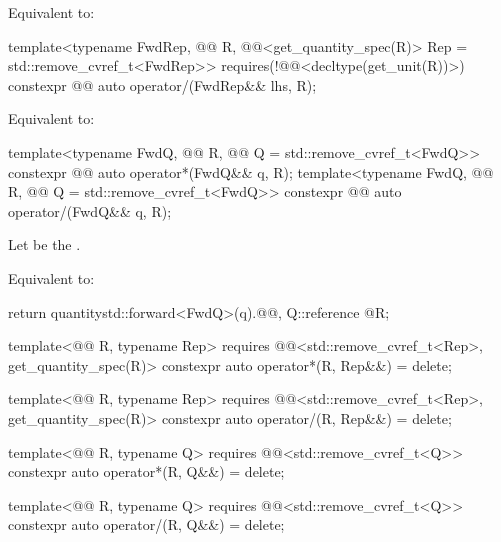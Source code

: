 \begin{itemdescr}
\pnum
\effects
Equivalent to:
\end{itemdescr}

\begin{itemdecl}
template<typename FwdRep, @@ R,
         @@<get_quantity_spec(R{})> Rep = std::remove_cvref_t<FwdRep>>
  requires(!@@<decltype(get_unit(R{}))>)
constexpr @@ auto operator/(FwdRep&& lhs, R);
\end{itemdecl}

\begin{itemdescr}
\pnum
\effects
Equivalent to:
\end{itemdescr}

\begin{itemdecl}
template<typename FwdQ, @@ R, @@ Q = std::remove_cvref_t<FwdQ>>
constexpr @@ auto operator*(FwdQ&& q, R);
template<typename FwdQ, @@ R, @@ Q = std::remove_cvref_t<FwdQ>>
constexpr @@ auto operator/(FwdQ&& q, R);
\end{itemdecl}

\begin{itemdescr}
\pnum
Let  be the .

\pnum
\effects
Equivalent to:
\begin{codeblock}
return quantity{std::forward<FwdQ>(q).@@, Q::reference @\atsign@ R{}};
\end{codeblock}
\end{itemdescr}

\begin{itemdecl}
template<@@ R, typename Rep>
  requires @@<std::remove_cvref_t<Rep>, get_quantity_spec(R{})>
constexpr auto operator*(R, Rep&&) = delete;

template<@@ R, typename Rep>
  requires @@<std::remove_cvref_t<Rep>, get_quantity_spec(R{})>
constexpr auto operator/(R, Rep&&) = delete;

template<@@ R, typename Q>
  requires @@<std::remove_cvref_t<Q>>
constexpr auto operator*(R, Q&&) = delete;

template<@@ R, typename Q>
  requires @@<std::remove_cvref_t<Q>>
constexpr auto operator/(R, Q&&) = delete;
\end{itemdecl}

